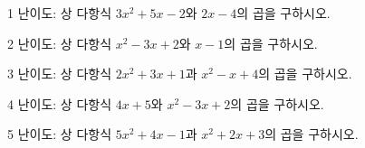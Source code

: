 \documentclass[fleqn]{article}
\begin{document}
   
1 난이도: 상 다항식 \(3x^2 + 5x - 2\)와 \(2x - 4\)의 곱을 구하시오.

2 난이도: 상 다항식 \(x^2 - 3x + 2\)와 \(x - 1\)의 곱을 구하시오.

3 난이도: 상 다항식 \(2x^2 + 3x + 1\)과 \(x^2 - x + 4\)의 곱을 구하시오.

4 난이도: 상 다항식 \(4x + 5\)와 \(x^2 - 3x + 2\)의 곱을 구하시오.

5 난이도: 상 다항식 \(5x^2 + 4x - 1\)과 \(x^2 + 2x + 3\)의 곱을
구하시오.
\end{document}
